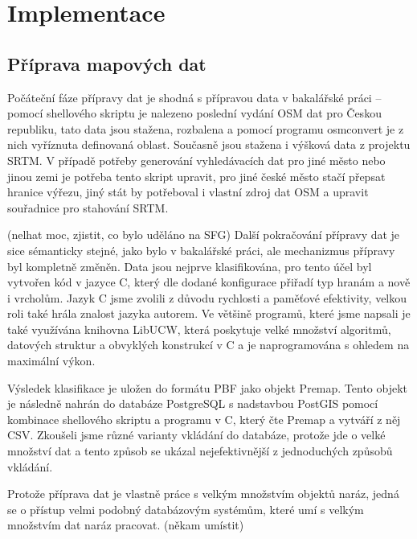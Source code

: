 \chapter{Implementace}
\label{ch:implementace}
\section{Příprava mapových dat}
\label{ch:implementace:OSM}
Počáteční fáze přípravy dat je shodná s přípravou data v bakalářské práci --
pomocí shellového skriptu je nalezeno poslední vydání OSM dat pro Českou
republiku, tato data jsou stažena, rozbalena a pomocí programu osmconvert je z
nich vyříznuta definovaná oblast. Současně jsou stažena i výšková data z
projektu SRTM. V případě potřeby generování vyhledávacích dat pro jiné město
nebo jinou zemi je potřeba tento skript upravit, pro jiné české město stačí
přepsat hranice výřezu, jiný stát by potřeboval i vlastní zdroj dat OSM a
upravit souřadnice pro stahování SRTM. 

(\TODO nelhat moc, zjistit, co bylo uděláno na SFG) Další pokračování přípravy
dat je sice sémanticky stejné, jako bylo v bakalářské práci, ale mechanizmus
přípravy byl kompletně změněn. Data jsou nejprve klasifikována, pro tento účel
byl vytvořen kód v jazyce C, který dle dodané konfigurace přiřadí typ hranám a
nově i vrcholům. Jazyk C jsme zvolili z důvodu rychlosti a paměťové efektivity,
velkou roli také hrála znalost jazyka autorem. Ve většině programů, které jsme
napsali je také využívána knihovna LibUCW\cite{LibUCW}, která poskytuje velké
množství algoritmů, datových struktur a obvyklých konstrukcí v C a je
naprogramována s ohledem na maximální výkon.

Výsledek klasifikace je uložen do formátu PBF jako objekt Premap. Tento objekt
je následně nahrán do databáze PostgreSQL s nadstavbou PostGIS pomocí kombinace
shellového skriptu a programu v C, který čte Premap a vytváří z něj CSV.
Zkoušeli jsme různé varianty vkládání do databáze, protože jde o velké množství
dat a tento způsob se ukázal nejefektivnější z jednoduchých způsobů vkládání. 

Protože příprava dat je vlastně práce s velkým množstvím objektů naráz, jedná se
o přístup velmi podobný databázovým systémům, které umí s velkým množstvím dat
naráz pracovat. (\TODO někam umístit) 

